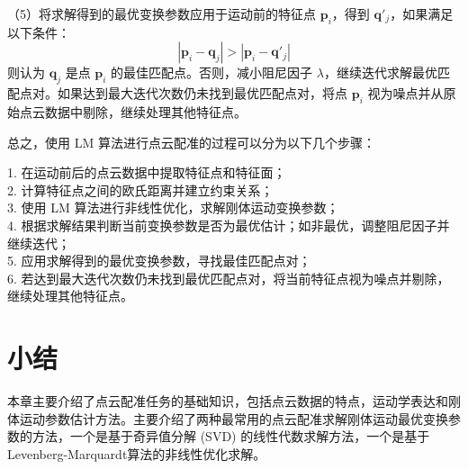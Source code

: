 （5）将求解得到的最优变换参数应用于运动前的特征点 $\boldsymbol{p}_i$，得到 $\boldsymbol{q}'_j$，如果满足以下条件：
\begin{equation}
|\boldsymbol{p}_i - \boldsymbol{q}_j| > |\boldsymbol{p}_i - \boldsymbol{q}'_j|
\end{equation}
则认为 $\boldsymbol{q}_j$ 是点 $\boldsymbol{p}_i$ 的最佳匹配点。否则，减小阻尼因子 $\lambda$，继续迭代求解最优匹配点对。如果达到最大迭代次数仍未找到最优匹配点对，将点 $\boldsymbol{p}_i$ 视为噪点并从原始点云数据中剔除，继续处理其他特征点。

总之，使用 LM 算法进行点云配准的过程可以分为以下几个步骤：

1. 在运动前后的点云数据中提取特征点和特征面；\\
2. 计算特征点之间的欧氏距离并建立约束关系；\\
3. 使用 LM 算法进行非线性优化，求解刚体运动变换参数；\\
4. 根据求解结果判断当前变换参数是否为最优估计；如非最优，调整阻尼因子并继续迭代；\\
5. 应用求解得到的最优变换参数，寻找最佳匹配点对；\\
6. 若达到最大迭代次数仍未找到最优匹配点对，将当前特征点视为噪点并剔除，继续处理其他特征点。

\section{小结}
本章主要介绍了点云配准任务的基础知识，包括点云数据的特点，运动学表达和刚体运动参数估计方法。主要介绍了两种最常用的点云配准求解刚体运动最优变换参数的方法，一个是基于奇异值分解 (SVD) 的线性代数求解方法，一个是基于Levenberg-Marquardt算法的非线性优化求解。